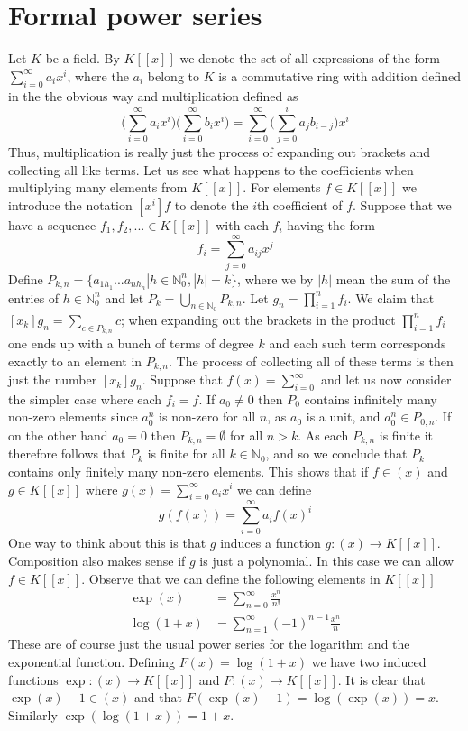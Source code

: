 \documentclass{article}
\newcommand{\mbb}[1]{\mathbb{#1}}
\begin{document}
\section{Formal power series}
Let $K$ be a field. By $K[[x]]$ we denote the set of all expressions of the form $\sum_{i = 0}^\infty a_ix^i$, where the $a_i$ belong to $K$ is a commutative ring with addition defined in the the obvious way and multiplication defined as 
$$\bigl( \sum_{i = 0}^\infty a_ix^i \bigr) \bigl(\sum_{i = 0}^\infty b_ix^i\bigr) = \sum_{i = 0}^{\infty}\bigl( \sum_{j = 0}^i a_j b_{i-j} \bigr) x^i$$
Thus, multiplication is really just the process of expanding out brackets and collecting all like terms. Let us see what happens to the coefficients when multiplying many elements from $K[[x]]$. For elements $f \in K[[x]]$ we introduce the notation $[x^i]f$ to denote the $i$th coefficient of $f$. Suppose that we have a sequence $f_1, f_2, ... \in K[[x]]$ with each $f_i$ having the form 
$$f_i = \sum_{j=0}^\infty a_{ij}x^j$$
Define $P_{k,n} = \{ a_{1h_1} ... a_{nh_n} | h \in \mbb N_0^n,|h| = k \}$, where we by $|h|$ mean the sum of the entries of $h \in \mbb N^n_0$ and let $P_k = \bigcup_{n \in \mbb N_0} P_{k,n}$. Let $g_n = \prod_{i=1}^{n}f_i$. We claim that $[x_k]g_n = \sum_{c \in P_{k,n}} c$; when expanding out the brackets in the product $\prod_{i=1}^{n}f_i$ one ends up with a bunch of terms of degree $k$ and each such term corresponds exactly to an element in $P_{k,n}$. The process of collecting all of these terms is then just the number $[x_k]g_n$. Suppose that $f(x) = \sum_{i=0}^{\infty}$ and let us now consider the simpler case where each $f_i = f$. If $a_0 \neq 0$ then $P_0$ contains infinitely many non-zero elements since $a_0^n$ is non-zero for all $n$, as $a_0$ is a unit, and $a_0^n \in P_{0,n}$. If on the other hand $a_0 = 0$ then $P_{k,n} = \emptyset$ for all $n > k$. As each $P_{k,n}$ is finite it therefore follows that $P_k$ is finite for all $k \in \mbb N_0$, and so we conclude that $P_k$ contains only finitely many non-zero elements. This shows that if $f \in (x)$ and $g \in K[[x]]$ where $g(x) = \sum_{i = 0}^\infty a_i x^i$ we can define 
$$g(f(x)) = \sum_{i = 0}^\infty a_i f(x)^i$$
One way to think about this is that $g$ induces a function $g : (x) \to K[[x]]$. Composition also makes sense if $g$ is just a polynomial. In this case we can allow $f \in K[[x]]$. Observe that we can define the following elements in $K[[x]]$
\begin{align*}
    \exp(x) &= \sum_{n = 0}^\infty \frac{x^n}{n!} \\
    \log (1 + x) &= \sum_{n = 1}^\infty (-1)^{n-1}\frac{x^n}{n}
\end{align*}
These are of course just the usual power series for the logarithm and the exponential function. Defining $F(x) = \log(1 + x)$ we have two induced functions $\exp : (x) \to K[[x]]$ and $F : (x) \to K[[x]]$. It is clear that $\exp (x) - 1 \in (x)$ and that $F(\exp (x) - 1) = \log (\exp (x)) = x$. Similarly $\exp(\log(1+x)) = 1+x$.
\end{document}
